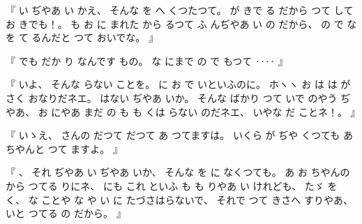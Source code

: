 %
『
い
ぢやあ
い
かえ、
%
そんな
を
へ
くつたつて。
%
が
きで
る
だから
つて
して
お
きでも！。
%
も
お
に
まれた
から
るつて
ふ
んぢやあ
い
の
だから、
%
の
で
な
を
て
るんだと
つて
おいでな。
』

%
『
でも
だか
り
なんです
もの。
%
な
にまで
の
で%
もつて
‥‥
』

%
『
いよ、
%
そんな
らない
ことを。
%
に
お
で
いといふのに。
%
ホヽヽ
お
は
は
が
さく
おなりだネエ。
%
はない
ぢやあ
いか。
%
そんな
ばかり
つて
いで
のやう
ぢやあ、
%
お
にやあ
まだ
の
も
も
くは
らない
のだネエ、
%
いやな
だ
ことネ！。
』

%
『
いゝえ、
%
さんの
だつて
だつて
あ
つてますは。
%
%
いくら
が
ぢや
くつても
あ
ちやんと
つて
ますよ。
』

%
『
、
%
それ
ぢやあ
い
ぢやあ
いか、
%
そんな
を
に
なくつても。
%
あ
お
ちやんの
から
つてる
りにネ、
%
にも
これ
といふ
も
も
りやあ
い
けれども、
%
たゞ
を
く、
%
な
ことや
な
や
い
に
たづさはらないで、
%
%
それで
つて%
きさへ
すりやあ、
%
いと
つてる
の
だから。
』

